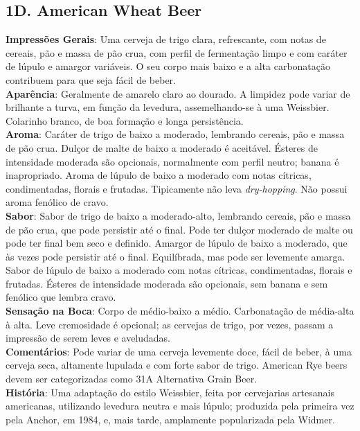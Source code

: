 \subsection*{1D. American Wheat Beer}
\textbf{Impressões Gerais}: Uma cerveja de trigo clara, refrescante, com notas de cereais, pão e massa de pão crua, com perfil de fermentação limpo e com caráter de lúpulo e amargor variáveis. O seu corpo mais baixo e a alta carbonatação contribuem para que seja fácil de beber. \\
\textbf{Aparência}: Geralmente de amarelo claro ao dourado. A limpidez pode variar de brilhante a turva, em função da levedura, assemelhando-se à uma Weissbier. Colarinho branco, de boa formação e longa persistência. \\
\textbf{Aroma}: Caráter de trigo de baixo a moderado, lembrando cereais, pão e massa de pão crua. Dulçor de malte de baixo a moderado é aceitável. Ésteres de intensidade moderada são opcionais, normalmente com perfil neutro; banana é inapropriado. Aroma de lúpulo de baixo a moderado com notas cítricas, condimentadas, florais e frutadas. Tipicamente não leva \textit{dry-hopping}. Não possui aroma fenólico de cravo. \\
\textbf{Sabor}: Sabor de trigo de baixo a moderado-alto, lembrando cereais, pão e massa de pão crua, que pode persistir até o final. Pode ter dulçor moderado de malte ou pode ter final bem seco e definido. Amargor de lúpulo de baixo a moderado, que às vezes pode persistir até o final. Equilíbrada, mas pode ser levemente amarga. Sabor de lúpulo de baixo a moderado com notas cítricas, condimentadas, florais e frutadas. Ésteres de intensidade moderada são opcionais, sem banana e sem fenólico que lembra cravo. \\
\textbf{Sensação na Boca}: Corpo de médio-baixo a médio. Carbonatação de média-alta à alta. Leve cremosidade é opcional; as cervejas de trigo, por vezes, passam a impressão de serem leves e aveludadas. \\
\textbf{Comentários}: Pode variar de uma cerveja levemente doce, fácil de beber, à uma cerveja seca, altamente lupulada e com forte sabor de trigo. American Rye beers devem ser categorizadas como 31A Alternativa Grain Beer. \\
\textbf{História}: Uma adaptação do estilo Weissbier, feita por cervejarias artesanais americanas, utilizando levedura neutra e mais lúpulo; produzida pela primeira vez pela Anchor, em 1984, e, mais tarde, amplamente popularizada pela Widmer. \\
